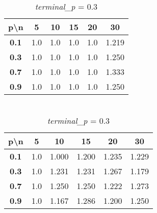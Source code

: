 \documentclass[a4paper,12pt]{article}
\begin{document}
    \vspace{1em}

    \begin{table}[h!]
        \begin{minipage}{0.47\textwidth}
            \centering
            \caption*{Max Approximate Coefficient}
            \begin{tabular}{c|ccccc}
                \toprule
                \textbf{p\textbackslash n} & \textbf{5} & \textbf{10} & \textbf{15} & \textbf{20} & \textbf{30} \\
                \midrule
                \textbf{0.1} & 1.0 & 1.0 & 1.0 & 1.0 & 1.219 \\
                \textbf{0.3} & 1.0 & 1.0 & 1.0 & 1.0 & 1.250 \\
                \textbf{0.7} & 1.0 & 1.0 & 1.0 & 1.0 & 1.333 \\
                \textbf{0.9} & 1.0 & 1.0 & 1.0 & 1.0 & 1.250 \\
                \bottomrule
            \end{tabular}
            \caption*{\\\textit{terminal\_p} = $0.1$}
        \end{minipage}
        \hfill
        \begin{minipage}{0.47\textwidth}
            \centering
            \caption*{Max Approximate Coefficient}
            \begin{tabular}{c|ccccc}
                \toprule
                \textbf{p\textbackslash n} & \textbf{5} & \textbf{10} & \textbf{15} & \textbf{20} & \textbf{30} \\
                \midrule
                \textbf{0.1} & 1.0 & 1.000 & 1.200 & 1.235 & 1.229 \\
                \textbf{0.3} & 1.0 & 1.231 & 1.231 & 1.267 & 1.179 \\
                \textbf{0.7} & 1.0 & 1.250 & 1.250 & 1.222 & 1.273 \\
                \textbf{0.9} & 1.0 & 1.167 & 1.286 & 1.200 & 1.250 \\
                \bottomrule
            \end{tabular}
            \caption*{\\\textit{terminal\_p} = $0.3$}
        \end{minipage}
    \end{table}
\end{document}
